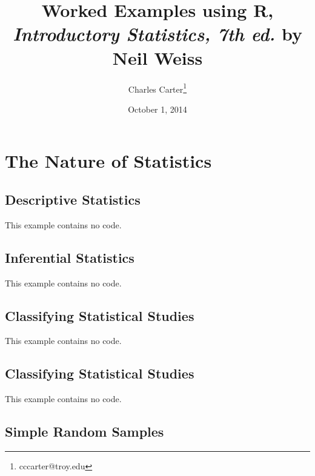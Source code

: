 \documentclass{article}\usepackage[]{graphicx}\usepackage[]{color}
\title{Worked Examples using \textsf{R}, \textit{Introductory Statistics, 7th ed.} by Neil Weiss}
\author{Charles Carter\thanks{cccarter@troy.edu}}
\date{October 1, 2014}
\begin{document}
\maketitle{}
\tableofcontents{}

\section{The Nature of Statistics}

\subsection{Descriptive Statistics}This example contains no code.

\subsection{Inferential Statistics}This example contains no code.

\subsection{Classifying Statistical Studies}This example contains no code.

\subsection{Classifying Statistical Studies}This example contains no code.

\subsection{Simple Random Samples}
\end{document}
